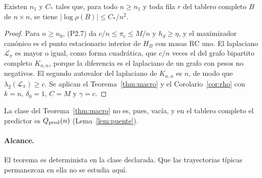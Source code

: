 \begin{corolario}\label{cor:completo}
Existen $n_1$ y $C_*$ tales que, para todo $n\ge n_1$ y toda fila $r$ del tablero completo $B$ de
$n\times n$, se tiene $|\log\rho(B)|\le C_*/n^2$.
\end{corolario}
\begin{proof}
Para $n\ge n_0$, (P2.7) da $c/n\le\pi_e\le M/n$ y $h_d\ge\eta$, y el maximizador canónico es el punto
estacionario interior de $H_B$ con masas RC uno. El laplaciano $\mathscr L_\pi$ es mayor o igual, como
forma cuadrática, que $c/n$ veces el del grafo bipartito completo $K_{n,n}$, porque la diferencia es
el laplaciano de un grafo con pesos no negativos. El segundo autovalor del laplaciano de $K_{n,n}$
es $n$, de modo que $\lambda_2(\mathscr L_\pi)\ge c$. Se aplican el Teorema~\ref{thm:macro} y el
Corolario~\ref{cor:rho} con $k=n$, $\delta_0=1$, $C=M$ y $\gamma=c$.
\end{proof}
La clase del Teorema~\ref{thm:macro} no es, pues, vacía, y en el tablero completo el predictor es
$Q_{\rm pred}(n)$ (Lema~\ref{lem:puente}).

\paragraph{Alcance.}
El teorema es determinista en la clase declarada. Que las trayectorias típicas
permanezcan en ella no se estudia aquí.
